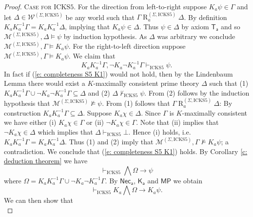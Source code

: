 \documentclass{myifcolog}
\newcommand{\K}{K}
\newcommand{\agi}{a}
\newcommand{\fw}{\mathcal{M}}
\newcommand{\Rel}{\mathrel{R}}
\newcommand{\W}{\mathcal{W}}
\newcommand{\hickss}{\mathrm{ICKS5}}
\numberwithin{theorem}{section}
\begin{document}
\begin{proof}
 \noindent \textsc{Case for $\hickss$.} For the direction from left-to-right suppose $\K_\agi \psi \in \Gamma$ and let $\Delta \in \W^{(\Sigma, \hickss)}$ be any world such that $\Gamma \Rel_\agi^{(\Sigma, \hickss)} \Delta$. By definition $\K_\agi \K_\agi^{-1} \Gamma = \K_\agi \K_\agi^{-1} \Delta$, implying that $\K_\agi \psi \in \Delta$. Thus $\psi \in \Delta$ by axiom $\mathsf{T_\agi}$ and so $\fw^{(\Sigma, \hickss)}, \Delta \models \psi$ by induction hypothesis. As $\Delta$ was arbitrary we conclude $\fw^{(\Sigma, \hickss)}, \Gamma \models \K_\agi \psi$. For the right-to-left direction suppose $\fw^{(\Sigma, \hickss)}, \Gamma \models \K_\agi \psi$. We claim that
 \begin{equation}\label{e: completeness S5 K1}
     \K_\agi \K_\agi^{-1} \Gamma, \neg \K_\agi \neg \K_\agi^{-1} \Gamma \vdash_\hickss \psi.
 \end{equation}
 In fact if (\ref{e: completeness S5 K1}) would not hold, then by the Lindenbaum Lemma there would exist a $\K$-maximally consistent prime theory $\Delta$ such that (1) $ \K_\agi \K_\agi^{-1} \Gamma \cup \neg \K_\agi \neg \K_\agi^{-1} \Gamma \subseteq \Delta$ and (2) $\Delta \not \vdash_\hickss \psi$. From (2) follows by the induction hypothesis that $\fw^{(\Sigma, \hickss)} \not \models \psi$. From (1) follows that $\Gamma \Rel_\agi^{(\Sigma, \hickss)} \Delta$: By construction $\K_\agi \K_\agi^{-1} \Gamma \subseteq \Delta$. Suppose $\K_\agi \chi \in \Delta$. Since $\Gamma$ is $\K$-maximally consistent we have either (i) $\K_\agi \chi \in \Gamma$ or (ii) $\neg \K_\agi \chi \in \Gamma$. Note that (ii) implies that $\neg \K_\agi \chi \in \Delta$ which implies that $\Delta \vdash_\hickss \bot$. Hence (i) holds, i.e. $\K_\agi \K_\agi^{-1} \Gamma = \K_\agi \K_\agi^{-1} \Delta$. Thus (1) and (2) imply that $\fw^{(\Sigma, \hickss)}, \Gamma \not \models \K_\agi \psi$; a contradiction. We conclude that (\ref{e: completeness S5 K1}) holds. By Corollary \ref{c: deduction theorem} we have
 \begin{equation}\label{e: completeness S5 K2}
     \vdash_\hickss \bigwedge \Omega \rightarrow \psi
 \end{equation}
 where $\Omega = \K_\agi \K_\agi^{-1} \Gamma \cup \neg \K_\agi \neg \K_\agi^{-1} \Gamma$. By $\mathsf{Nec_\agi}$, $\mathsf{K_\agi}$ and $\mathsf{MP}$ we obtain
 \begin{equation}\label{e: completeness S5 K3}
     \vdash_\hickss \K_\agi \bigwedge \Omega \rightarrow \K_\agi \psi.
 \end{equation}
We can then show that 
 \begin{equation}\label{e: completeness S5 K4}

\end{equation}
\end{proof}
\end{document}
